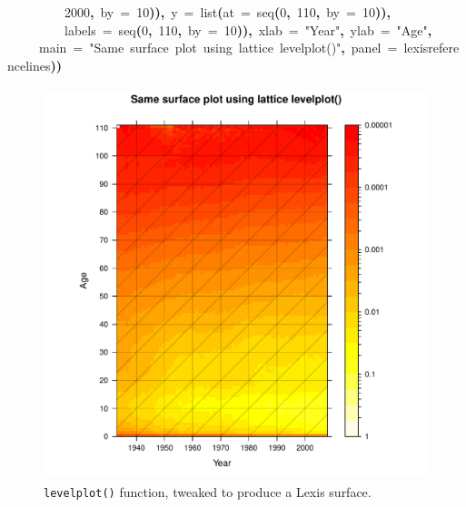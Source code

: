 \documentclass[a4paper]{article}
\newcommand{\hlnumber}[1]{\textcolor[rgb]{0.0823529411764706,0.0784313725490196,0.709803921568627}{#1}}%
\newcommand{\hlfunctioncall}[1]{\textcolor[rgb]{1,0,0}{#1}}%
\newcommand{\hlstring}[1]{\textcolor[rgb]{0.6,0.6,1}{#1}}%
\newcommand{\hlkeyword}[1]{\textcolor[rgb]{0,0,0}{\textbf{#1}}}%
\newcommand{\hlargument}[1]{\textcolor[rgb]{0.694117647058824,0.247058823529412,0.0196078431372549}{#1}}%
\newcommand{\hlsymbol}[1]{\textcolor[rgb]{0,0,0}{#1}}%
\newcommand{\hlprompt}[1]{\textcolor[rgb]{0,0,0}{#1}}%
\newcommand{\hlstd}[1]{\textcolor[rgb]{0,0,0}{#1}}%
\newenvironment{Houtput}{\raggedright}{%
%
}
\begin{document}
\begin{Houtput}
\hlstd{}\hlprompt{{\ }}{\ }{\ }{\ }{\ }{\ }{\ }{\ }{\ }\hlnumber{2000}\hlkeyword{,}{\ }\hlargument{by}{\ }\hlargument{=}{\ }\hlnumber{10}\hlkeyword{)}\hlkeyword{)}\hlkeyword{,}{\ }\hlargument{y}{\ }\hlargument{=}{\ }\hlfunctioncall{list}\hlkeyword{(}\hlargument{at}{\ }\hlargument{=}{\ }\hlfunctioncall{seq}\hlkeyword{(}\hlnumber{0}\hlkeyword{,}{\ }\hlnumber{110}\hlkeyword{,}{\ }\hlargument{by}{\ }\hlargument{=}{\ }\hlnumber{10}\hlkeyword{)}\hlkeyword{)}\hlkeyword{,}\hspace*{\fill}\\
\hlstd{}\hlprompt{{\ }}{\ }{\ }{\ }{\ }{\ }{\ }{\ }{\ }\hlargument{labels}{\ }\hlargument{=}{\ }\hlfunctioncall{seq}\hlkeyword{(}\hlnumber{0}\hlkeyword{,}{\ }\hlnumber{110}\hlkeyword{,}{\ }\hlargument{by}{\ }\hlargument{=}{\ }\hlnumber{10}\hlkeyword{)}\hlkeyword{)}\hlkeyword{,}{\ }\hlargument{xlab}{\ }\hlargument{=}{\ }\hlstring{"Year"}\hlkeyword{,}{\ }\hlargument{ylab}{\ }\hlargument{=}{\ }\hlstring{"Age"}\hlkeyword{,}\hspace*{\fill}\\
\hlstd{}\hlprompt{{\ }}{\ }{\ }{\ }{\ }\hlargument{main}{\ }\hlargument{=}{\ }\hlstring{"Same{\ }surface{\ }plot{\ }using{\ }lattice{\ }levelplot()"}\hlkeyword{,}{\ }\hlargument{panel}{\ }\hlargument{=}{\ }\hlsymbol{lexisreferencelines}\hlkeyword{)}\hlkeyword{)}\mbox{}
\normalfont
\hspace*{\fill}\\
\hlstd{}
\end{Houtput}



\begin{figure}[H]
\centering
\includegraphics[width=4.5in,height=4.5in]{figs/latticegood.pdf}
\caption{\texttt{levelplot()} function, tweaked to produce a Lexis surface.}
\end{figure}
\end{document}
